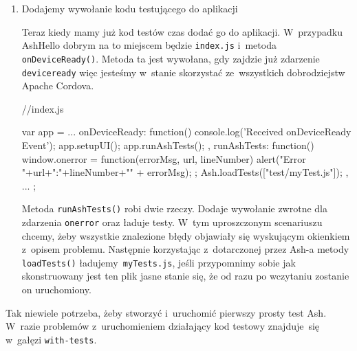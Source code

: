 \documentclass{xmgr}
\begin{document}
\begin{enumerate}
\begin{javascriptcode}
{      //jeśli aplikacja dotarła tutaj,
      //  to zaliczmy ten przypadek testowy
      Ash.endTest();
    });
\end{javascriptcode}

Powyższy kod nie jest bardziej skomplikowany od poprzedniego. Jedyną nowością jest zastosowanie wielu bloków 

\begin{quote}
  \texttt{then(function(){ ... })}
\end{quote}

które są wykonywane jeden po drugim w~kolejności podania i~pozwalają nam łączyć mniejsze funkcje testujące w~bardziej złożone bloki.

 \item Dodajemy wywołanie kodu testującego do aplikacji

Teraz kiedy mamy już kod testów czas dodać go do aplikacji. W~przypadku AshHello dobrym na to miejscem będzie \texttt{index.js} i~metoda \mbox{\texttt{onDeviceReady()}}. Metoda ta jest wywołana, gdy zajdzie już zdarzenie \texttt{deviceready} więc jesteśmy w~stanie skorzystać ze~wszystkich dobrodziejstw Apache Cordova.

 \begin{javascriptcode}
  //index.js
  
  var app = {
	...
    onDeviceReady: function() {
        console.log('Received onDeviceReady Event');
        app.setupUI();
        app.runAshTests();
    },
    runAshTests: function() {
        window.onerror = function(errorMsg, url, lineNumber) {
            alert("Error "+url+":"+lineNumber+"\n" + errorMsg);
        };
        Ash.loadTests(["test/myTest.js"]);
    },
	...
  };

\end{javascriptcode}

Metoda \texttt{runAshTests()} robi dwie rzeczy. Dodaje wywołanie zwrotne dla zdarzenia \texttt{onerror} oraz ładuje testy. W~tym uproszczonym scenariuszu chcemy, żeby wszystkie znalezione błędy objawiały się wyskującym okienkiem z~opisem problemu. Następnie korzystając z~dotarczonej przez Ash-a metody \texttt{loadTests()} ładujemy\texttt{ myTests.js}, jeśli przypomnimy sobie jak skonstruowany jest ten plik jasne stanie się, że od razu po wczytaniu zostanie on uruchomiony. 

\end{enumerate}

Tak niewiele potrzeba, żeby stworzyć i~uruchomić pierwszy prosty test Ash. W~razie problemów z~uruchomieniem działający kod testowy znajduje~się w~gałęzi \texttt{with-tests}.
\end{document}
